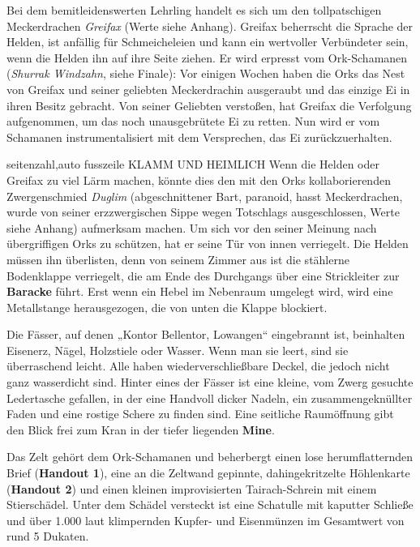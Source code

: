 Bei dem bemitleidenswerten Lehrling handelt es sich um den tollpatschigen Meckerdrachen \textit{Greifax} (Werte siehe Anhang). Greifax beherrscht die Sprache der Helden, ist anfällig für Schmeicheleien und kann ein wertvoller Verbündeter sein, wenn die Helden ihn auf ihre Seite ziehen. Er wird erpresst vom Ork-Schamanen (\textit{Shurrak Windzahn}, siehe Finale): Vor einigen Wochen haben die Orks das Nest von Greifax und seiner geliebten Meckerdrachin ausgeraubt und das einzige Ei in ihren Besitz gebracht. Von seiner Geliebten verstoßen, hat Greifax die Verfolgung aufgenommen, um das noch unausgebrütete Ei zu retten. Nun wird er vom Schamanen instrumentalisiert mit dem Versprechen, das Ei zurückzuerhalten.

{{seitenzahl,auto}}
{{fusszeile KLAMM UND HEIMLICH}}
\neueseite
Wenn die Helden oder Greifax zu viel Lärm machen, könnte dies den mit den Orks kollaborierenden Zwergenschmied \textit{Duglim} (abgeschnittener Bart, paranoid, hasst Meckerdrachen, wurde von seiner erzzwergischen Sippe wegen Totschlags ausgeschlossen, Werte siehe Anhang) aufmerksam machen. Um sich vor den seiner Meinung nach übergriffigen Orks zu schützen, hat er seine Tür von innen verriegelt. Die Helden müssen ihn überlisten, denn von seinem Zimmer aus ist die stählerne Bodenklappe verriegelt, die am Ende des Durchgangs über eine Strickleiter zur \textbf{Baracke} führt. Erst wenn ein Hebel im Nebenraum umgelegt wird, wird eine Metallstange herausgezogen, die von unten die Klappe blockiert.


Die Fässer, auf denen „Kontor Bellentor, Lowangen“ eingebrannt ist, beinhalten Eisenerz, Nägel, Holzstiele oder Wasser. Wenn man sie leert, sind sie überraschend leicht. Alle haben wiederverschließbare Deckel, die jedoch nicht ganz wasserdicht sind. Hinter eines der Fässer ist eine kleine, vom Zwerg gesuchte Ledertasche gefallen, in der eine Handvoll dicker Nadeln, ein zusammengeknüllter Faden und eine rostige Schere zu finden sind. Eine seitliche Raumöffnung gibt den Blick frei zum Kran in der tiefer liegenden \textbf{Mine}.


Das Zelt gehört dem Ork-Schamanen und beherbergt einen lose herumflatternden Brief (\textbf{Handout 1}), eine an die Zeltwand gepinnte, dahingekritzelte Höhlenkarte (\textbf{Handout 2}) und einen kleinen improvisierten Tairach-Schrein mit einem Stierschädel. Unter dem Schädel versteckt ist eine Schatulle mit kaputter Schließe und über 1.000 laut klimpernden Kupfer- und Eisenmünzen im Gesamtwert von rund 5 Dukaten.

